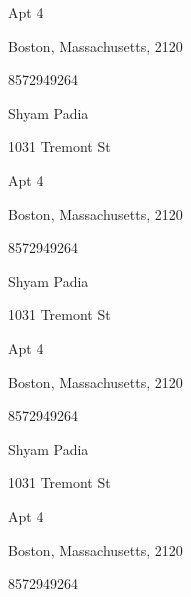 \documentclass[a4paper]{article}
\begin{document}
\begin{multicols}{2}
\begin{framed}
Apt 4\par
Boston, Massachusetts, 2120\par
8572949264
\end{framed}
\begin{framed}
Shyam Padia\par
1031 Tremont St\par
Apt 4\par
Boston, Massachusetts, 2120\par
8572949264
\end{framed}
\begin{framed}
Shyam Padia\par
1031 Tremont St\par
Apt 4\par
Boston, Massachusetts, 2120\par
8572949264
\end{framed}
\begin{framed}
Shyam Padia\par
1031 Tremont St\par
Apt 4\par
Boston, Massachusetts, 2120\par
8572949264
\end{framed}
\end{multicols}
\end{document}
